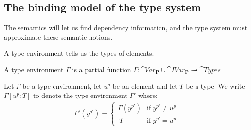 \documentclass{eptcs}
\begin{document}
\subsection{The binding model of the type system}\label{sec:basis}

The semantics will let us find dependency information, and the type 
system must approximate these semantic notions.





A type environment tells us the types of elements.

\begin{definition}
  A type environment $\Gamma$ is a partial function $\Gamma:\cat{Var}_{\mathbf{P}}\cup\cat{IVar}_{\mathbf{P}}\rightharpoonup\cat{Types}$
\end{definition}

\begin{definition}
	Let $\Gamma$ be a type environment, let $u^p$ be an element
        and let $T$ be a type.
	We write $\Gamma[u^p:T]$ to denote the type environment $\Gamma'$ where:
	\begin{align*}
		\Gamma'(y^{p'})=
		\left\{\begin{matrix}
			\Gamma(y^{p'}) & \mbox{if}\;y^{p'}\neq u^{p}\\\	 
			T & \mbox{if}\;y^{p'}=u^{p}
		\end{matrix}\right.
	\end{align*}
\end{definition}
\end{document}
